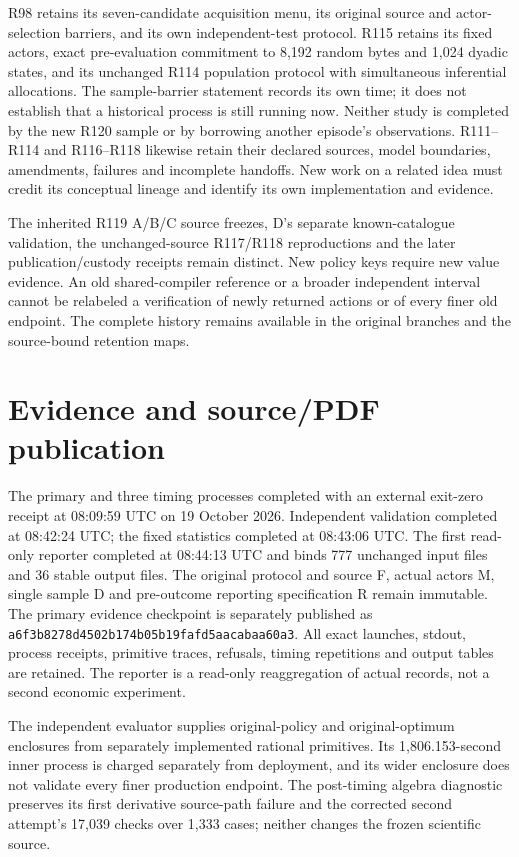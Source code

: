 R98 retains its seven-candidate acquisition menu, its original source and
actor-selection barriers, and its own independent-test protocol. R115
retains its fixed actors, exact pre-evaluation commitment to 8,192 random
bytes and 1,024 dyadic states, and its unchanged R114 population protocol
with simultaneous inferential allocations. The sample-barrier statement
records its own time; it does not establish that a historical process is
still running now. Neither study is completed by the new R120 sample
or by borrowing another episode's observations. R111--R114 and
R116--R118 likewise retain their declared sources, model boundaries,
amendments, failures and incomplete handoffs. New work on a related idea
must credit its conceptual lineage and identify its own implementation
and evidence.

The inherited R119 A/B/C source freezes, D's separate known-catalogue
validation, the unchanged-source R117/R118 reproductions and the later
publication/custody receipts remain distinct. New policy keys require new
value evidence. An old shared-compiler reference or a broader independent
interval cannot be relabeled a verification of newly returned actions or
of every finer old endpoint. The complete history remains available in
the original branches and the source-bound retention maps.

\section{Evidence and source/PDF publication}
The primary and three timing processes completed with an external exit-zero
receipt at 08:09:59 UTC on 19 October 2026. Independent validation completed
at 08:42:24 UTC; the fixed statistics completed at 08:43:06 UTC. The first
read-only reporter completed at 08:44:13 UTC and binds 777 unchanged input
files and 36 stable output files. The original protocol and source F,
actual actors M, single sample D and pre-outcome reporting specification R
remain immutable. The primary evidence checkpoint is separately published
as \nolinkurl{a6f3b8278d4502b174b05b19fafd5aacabaa60a3}.
All exact launches, stdout, process receipts, primitive traces, refusals,
timing repetitions and output tables are retained. The reporter is a
read-only reaggregation of actual records, not a second economic experiment.

The independent evaluator supplies original-policy and original-optimum
enclosures from separately implemented rational primitives. Its
1,806.153-second inner process is charged separately from deployment, and
its wider enclosure does not validate every finer production endpoint.
The post-timing algebra diagnostic preserves its first derivative
source-path failure and the corrected second attempt's 17,039 checks over
1,333 cases; neither changes the frozen scientific source.

